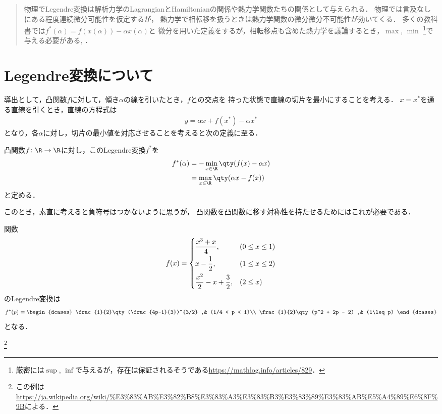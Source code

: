 \begin{abstract}
		物理でLegendre変換は解析力学のLagrangianとHamiltonianの関係や熱力学関数たちの関係として与えられる．
		物理では言及なしにある程度連続微分可能性を仮定するが，
		熱力学で相転移を扱うときは熱力学関数の微分微分不可能性が効いてくる．
		多くの教科書では$f^{*}(\alpha) = f(x(\alpha)) - \alpha x(\alpha)$と
		微分を用いた定義をするが，相転移点も含めた熱力学を議論するとき，$\max$, $\min$
		\footnote{厳密には$\sup$, $\inf$で与えるが，存在は保証されるそうである\url{https://mathlog.info/articles/829}．}で与える必要がある\cite[付録H]{Tasaki_thermo}, \cite[Chap.11]{thermo_shimizu}．
\end{abstract}
\section{Legendre変換について}
導出として，凸関数$f$に対して，傾き$\alpha$の線を引いたとき，$f$との交点を
持った状態で直線の切片を最小にすることを考える．
$x =x^{*}$を通る直線を引くとき，直線の方程式は
\begin{align}
		y = \alpha x + f(x^{*}) - \alpha x^{*} 
\end{align}
となり，各$\alpha$に対し，切片の最小値を対応させることを考えると次の定義に至る．
\begin{defn}[Legendre変換]
		凸関数$f\colon\R\to\R$に対し，このLegendre変換$f^{*}$を
		\begin{align}
				f^{*}(\alpha) &= -\min_{x\in\R}\qty(f(x)-\alpha x)\\
				 &= \max_{x\in\R}\qty(\alpha x - f(x))\label{def_legendre}
		\end{align}
		と定める．
\end{defn}
このとき，素直に考えると負符号はつかないように思うが，
凸関数を凸関数に移す対称性を持たせるためにはこれが必要である．
\begin{eg}
		関数
		\begin{align}
				f(x)=
				\begin{dcases}
						\frac{x^3+x}{4} ,& (0\leq x \leq 1)\\
						x-\frac{1}{2} ,& (1 \leq x \leq 2)\\
						\frac{x^2}{2} - x + \frac{3}{2} ,& (2\leq x)
				\end{dcases}
		\end{align}
		のLegendre変換は
		\begin{align}
				f^{*}(p) = 
				\begin{dcases}
						\frac{1}{2}\qty(\frac{4p-1}{3})^{3/2} ,& (1/4 < p < 1)\\
						\frac{1}{2}\qty(p^2 + 2p - 2) ,& (1\leq p)
				\end{dcases}
		\end{align}
		となる．

		\footnote{この例は\url{https://ja.wikipedia.org/wiki/\%E3\%83\%AB\%E3\%82\%B8\%E3\%83\%A3\%E3\%83\%B3\%E3\%83\%89\%E3\%83\%AB\%E5\%A4\%89\%E6\%8F\%9B}による．}
\end{eg}
